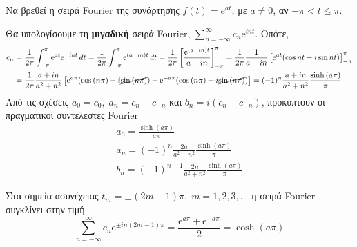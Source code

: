 \begin{mybox3}
\begin{example}
  Να βρεθεί η σειρά Fourier της συνάρτησης $ f(t) = e^{at} $, με $ a \neq 0 $, αν 
  $ - \pi < t \leq \pi $.
\end{example}
\end{mybox3}
\begin{solution}
  Θα υπολογίσουμε τη \textbf{μιγαδική} σειρά Fourier,  
  $ \sum\limits_{n=- \infty}^{\infty} c_{n} \mathrm{e}^{int} $. Οπότε, 
  \begin{align*}
    c_{n} &= \frac{1}{2 \pi} \int _{- \pi }^{\pi} \mathrm{e}^{at} \mathrm{e}^{-int } 
    \,{dt} = \frac{1}{2 \pi} \int _{- \pi }^{\pi} \mathrm{e}^{(a-in)t} \,{dt} = 
    \frac{1}{2 \pi} \left[\frac{\mathrm{e}^{(a-in)t}}{a- in} \right]_{- \pi }^{\pi} = 
    \frac{1}{2 \pi} \frac{1}{a-in} \left[\mathrm{e}^{at} (\cos{nt} - i 
    \sin{nt})\right]_{- \pi }^{\pi} \\
          &= \frac{1}{2 \pi} \frac{a+in}{a^{2}+n^{2}} 
          \left[\mathrm{e}^{a \pi} (\cos{(n \pi)- i \cancel{\sin{(n \pi)}}) - 
            \mathrm{e}^{-a \pi } (\cos{(n \pi )}}
          +i \cancel{\sin{(n \pi)}} )\right] = (-1)^{n} \frac{a+in}{a^{2}+n^{2}} 
          \frac{\sinh{(a \pi)}}{\pi}
  \end{align*}
  Από τις σχέσεις $ a_{0}= c_{0}, \; a_{n}= c_{n}+c_{-n} $ και 
  $ b_{n}=i(c_{n}-c_{-n}) $, προκύπτουν οι πραγματικοί συντελεστές Fourier
  \begin{gather*}
    a_{0}= \frac{\sinh{(a \pi)}}{a\pi}  \\
    a_{n}= (-1)^{n} \frac{2a}{a^{2}+n^{2}} \frac{\sinh{(a \pi)}}{\pi} \\
    b_{n} = (-1)^{n+1} \frac{2n}{a^{2}+n^{2}} \frac{\sinh{(a \pi)}}{\pi} 
  \end{gather*} 
\end{solution}
Στα σημεία ασυνέχειας $ t_{m} = \pm (2m-1) \pi, \; m=1,2,3,\ldots $ η σειρά Fourier 
συγκλίνει στην τιμή 
\[
  \sum_{n=- \infty}^{\infty} c_{n} \mathrm{e}^{\pm in (2m-1) \pi} = 
  \frac{\mathrm{e}^{a \pi} + \mathrm{e}^{- a \pi}}{2} = \cosh{(a \pi)}  
\] 






